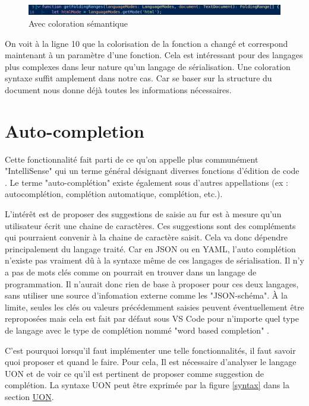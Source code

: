 \documentclass[
    iict, %
    il, %
]{heig-tb}
\begin{document}
\begin{figure}[!h]
    \begin{center}
        \includegraphics[width=15cm]{assets/figures/semantic-coloration-with.png}
    \end{center}
    \caption[Exemple avec coloration sémantique ]{\label{semantic-coloration-with} Avec coloration sémantique }
\end{figure}

On voit à la ligne 10 que la colorisation de la fonction a changé et correspond maintenant à un paramètre d'une fonction.
Cela est intéressant pour des langages plus complexes dans leur nature qu'un langage de sérialisation. Une coloration syntaxe suffit amplement dans notre cas.
Car se baser sur la structure du document nous donne déjà toutes les informations nécessaires.

\section{Auto-completion}

Cette fonctionnalité fait parti de ce qu'on appelle plus communément "IntelliSense" qui un terme général désignant diverses fonctions d'édition de code \cite{intelliSense}.
Le terme "auto-complétion" existe également sous d'autres appellations (ex : autocomplétion, complétion automatique, complétion, etc.).

L'intérêt est de proposer des suggestions de saisie au fur est à mesure qu'un utilisateur écrit une chaine de caractères.
Ces suggestions sont des compléments qui pourraient convenir à la chaine de caractère saisit. Cela va donc dépendre principalement du langage traité.
Car en JSON ou en YAML, l'auto complétion n'existe pas vraiment dû à la syntaxe même de ces langages de sérialisation.
Il n'y a pas de mots clés comme on pourrait en trouver dans un langage de programmation.
Il n'aurait donc rien de base à proposer pour ces deux langages, sans utiliser une source d'infomation externe comme les "JSON-schéma".
À la limite, seules les clés ou valeurs précédemment saisies peuvent éventuellement être reproposées mais cela est fait par défaut sous VS Code pour n'importe quel type de langage
avec le type de complétion nommé "word based completion" \cite{word-based-completions}.

C'est pourquoi lorsqu'il faut implémenter une telle fonctionnalités, il faut savoir quoi proposer et quand le faire.
Pour cela, Il est nécessaire d'analyser le langage UON et de voir ce qu'il est pertinent de proposer comme suggestion de complétion.
La syntaxe UON peut être exprimée par la figure \ref{syntax} dans la section \hyperref[UON]{UON}.
\end{document}
